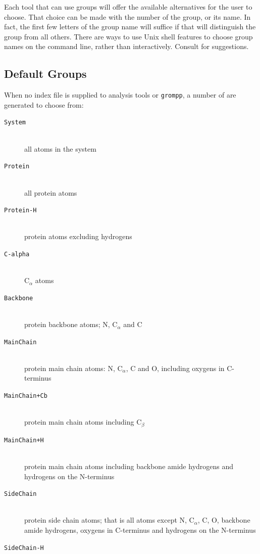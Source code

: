 %
Each tool that can use groups will offer the available alternatives
for the user to choose. That choice can be made with the number of the
group, or its name. In fact, the first few letters of the group
name will suffice if that will distinguish the group from all others.
There are ways to use Unix shell features to choose group names
on the command line, rather than interactively. Consult {\wwwpage}
for suggestions.

\subsection{Default Groups}
\label{subsec:defaultgroups}
When no index file is supplied to analysis tools or {\tt grompp},
a number of  are generated to choose from:
\begin{description}
\item[{\tt System}]\mbox{}\\
        all atoms in the system
\item[{\tt Protein}]\mbox{}\\
        all protein atoms
\item[{\tt Protein-H}]\mbox{}\\
        protein atoms excluding hydrogens
\item[{\tt C-alpha}]\mbox{}\\
        C$_{\alpha}$ atoms
\item[{\tt Backbone}]\mbox{}\\
        protein backbone atoms; N, C$_{\alpha}$ and C
\item[{\tt MainChain}]\mbox{}\\
        protein main chain atoms: N, C$_{\alpha}$, C and O, including
        oxygens in C-terminus
\item[{\tt MainChain+Cb}]\mbox{}\\
        protein main chain atoms including C$_{\beta}$
\item[{\tt MainChain+H}]\mbox{}\\
        protein main chain atoms including backbone amide hydrogens and
        hydrogens on the N-terminus
\item[{\tt SideChain}]\mbox{}\\
        protein side chain atoms; that is all atoms except N,
        C$_{\alpha}$, C, O, backbone amide hydrogens, oxygens in
        C-terminus and hydrogens on the N-terminus
\item[{\tt SideChain-H}]\mbox{}\\

\end{description}
